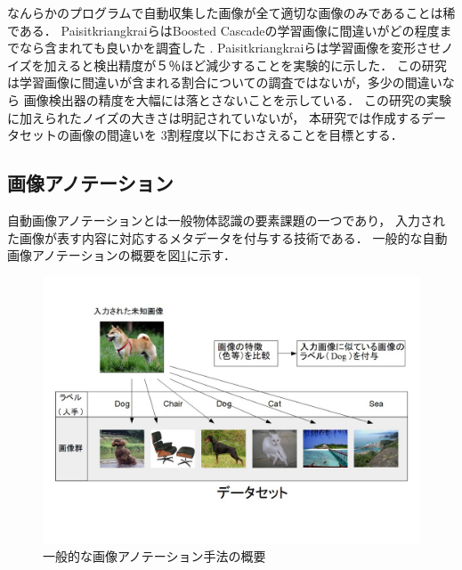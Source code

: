 \documentclass{deimj}
\begin{document}
なんらかのプログラムで自動収集した画像が全て適切な画像のみであることは稀である．
PaisitkriangkraiらはBoosted Cascadeの学習画像に間違いがどの程度までなら含まれても良いかを調査した
\cite{DBLP:journals/corr/abs-1009-5758}
.
Paisitkriangkraiらは学習画像を変形させノイズを加えると検出精度が５％ほど減少することを実験的に示した．
この研究は学習画像に間違いが含まれる割合についての調査ではないが，多少の間違いなら
画像検出器の精度を大幅には落とさないことを示している．
この研究の実験に加えられたノイズの大きさは明記されていないが，
本研究では作成するデータセットの画像の間違いを
3割程度以下におさえることを目標とする．

\subsection{画像アノテーション}

自動画像アノテーションとは一般物体認識の要素課題の一つであり，
入力された画像が表す内容に対応するメタデータを付与する技術である．
一般的な自動画像アノテーションの概要を図\ref{fig:abst}に示す．

\begin{figure}[tb]
 \begin{center}
  \includegraphics[scale=0.28]{gaiyou.jpg}
 \end{center}
 \caption{一般的な画像アノテーション手法の概要}
 \label{fig:abst}
\end{figure}
\end{document}
